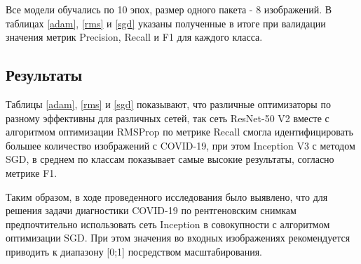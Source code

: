Все модели обучались по 10 эпох, размер одного пакета ­- 8 изображений. В таблицах \ref{adam}, \ref{rms} и \ref{sgd} указаны полученные в итоге при валидации значения метрик Precision, Recall и F1 для каждого класса.





\subsection{Результаты}
Таблицы \ref{adam}, \ref{rms} и \ref{sgd} показывают, что различные оптимизаторы по разному эффективны для различных сетей, так сеть ResNet-50 V2 вместе с алгоритмом оптимизации RMSProp по метрике Recall смогла идентифицировать большее количество изображений с COVID-19, при этом Inception V3 с методом SGD, в среднем по классам показывает самые высокие результаты, согласно метрике F1. 

Таким образом, в ходе проведенного исследования было выявлено, что для решения задачи диагностики COVID-19 по рентгеновским снимкам предпочтительно использовать сеть Inception в совокупности с алгоритмом оптимизации SGD. При этом значения во входных изображениях рекомендуется приводить к диапазону [0;1] посредством масштабирования. 




\clearpage